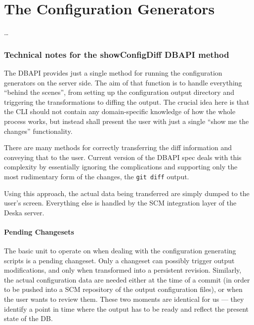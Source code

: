 \documentclass[deska]{subfiles}
\begin{document}
\chapter{The Configuration Generators}
\label{sec:config-generators}

\begin{abstract}
\end{abstract}

\ldots

\subsection{Technical notes for the showConfigDiff DBAPI method}

The DBAPI provides just a single method for running the configuration generators on the server side.  The aim of that
function is to handle everything ``behind the scenes'', from setting up the configuration output directory and
triggering the transformations to diffing the output.  The crucial idea here is that the CLI should not contain any
domain-specific knowledge of how the whole process works, but instead shall present the user with just a single ``show
me the changes'' functionality.

There are many methods for correctly transferring the diff information and conveying that to the user.  Current version
of the DBAPI spec deals with this complexity by essentially ignoring the complications and supporting only the most
rudimentary form of the changes, the {\tt git diff} output.

Using this approach, the actual data being transferred are simply dumped to the user's screen.  Everything else is
handled by the SCM integration layer of the Deska server.

\subsubsection{Pending Changesets}

The basic unit to operate on when dealing with the configuration generating scripts is a pending changeset.  Only a
changeset can possibly trigger output modifications, and only when transformed into a persistent revision.  Similarly,
the actual configuration data are needed either at the time of a commit (in order to be pushed into a SCM repository of
the output configuration files), or when the user wants to review them.  These two moments are identical for us --- they
identify a point in time where the output has to be ready and reflect the present state of the DB.
\end{document}
